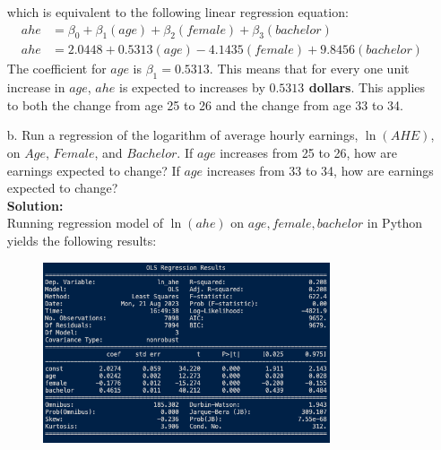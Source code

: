 \documentclass{uofa-eng-assignment}
\begin{document}
\begin{enumerate}
\begin{figure}[H]
        \end{figure}
        which is equivalent to the following linear regression equation:
        \begin{align*}
            ahe & = \beta_0 + \beta_1 (age) + \beta_2 (female) + \beta_3 (bachelor) \\
            ahe & = 2.0448 + 0.5313 (age) - 4.1435 (female) + 9.8456 (bachelor)
        \end{align*}
        The coefficient for $age$ is $\beta_1 = 0.5313$.
        This means that for every one unit increase in $age$, $ahe$ is expected to increases by \textbf{$\boldsymbol{0.5313}$ dollars}.
        This applies to both the change from age 25 to 26 and the change from age 33 to 34.\newpage
    \item[b.] Run a regression of the logarithm of average hourly earnings, $\ln{(AHE)}$,
        on $Age$, $Female$, and $Bachelor$. If $age$ increases from 25 to 26, how are
        earnings expected to change? If $age$ increases from 33 to 34, how are earnings
        expected to change? \\ \textbf{Solution:} \\ Running regression model of
        $\ln{(ahe)}$ on $age, female, bachelor$ in Python yields the following results:
        \begin{figure}[H]
            \centering
            \includegraphics[width=0.80\textwidth]{final-exam-b-1.png}

\end{figure}
\end{enumerate}
\end{document}
